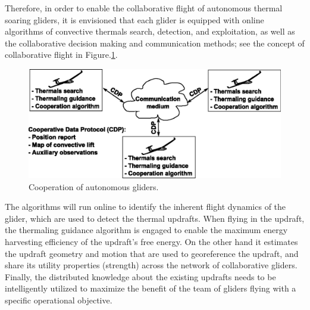 \documentclass[letterpaper, 10 pt, conference]{ieeeconf}  %
\begin{document}
Therefore, in order to enable the collaborative flight of autonomous thermal soaring gliders, it is envisioned that each glider is equipped with online algorithms of convective thermals search, detection, and exploitation, as well as the collaborative decision making and communication methods; see the concept of collaborative flight in Figure.\ref{fig:coop_scheme}.
\begin{figure}[thpb]
  \centering
  \includegraphics[scale=0.6]{Figures/coop_scheme_small.eps}
  \caption{Cooperation of autonomous gliders.}
  \label{fig:coop_scheme}
\end{figure}
The algorithms will run online to identify the inherent flight dynamics of the glider, which are used to detect the thermal updrafts. When flying in the updraft, the thermaling guidance algorithm is engaged to enable the maximum energy harvesting efficiency of the updraft’s free energy. On the other hand it estimates the updraft geometry and motion that are used to georeference the updraft, and share its utility properties (strength) across the network of collaborative gliders. Finally, the distributed knowledge about the existing updrafts needs to be intelligently utilized to maximize the benefit of the team of gliders flying with a specific operational objective.
\end{document}
